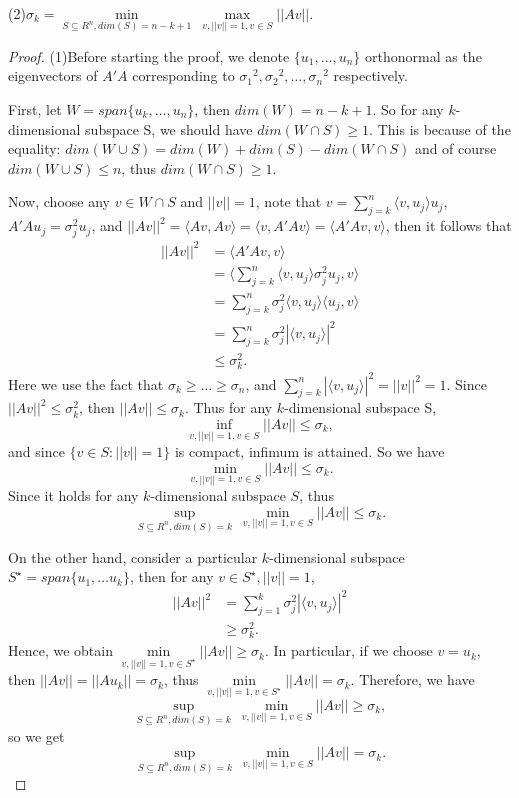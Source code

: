\noindent(2)$\sigma_k=\min \limits_{S\subseteq R^n,dim(S)=n-k+1}\ \max \limits_{v,||v||=1,v\in S} ||Av||.$
\begin{proof}
(1)Before starting the proof, we denote $\{u_1,\dots,u_n\}$ orthonormal as the eigenvectors of $A'A$ corresponding to ${\sigma_1}^2, {\sigma_2}^2, \dots, {\sigma_n}^2$ respectively.

First, let $W=span\{u_k,\dots,u_n\}$, then $dim(W)=n-k+1$. So for any $k$-dimensional subspace S, we should have $dim(W\cap S)\geq 1$. This is because of the equality: $dim(W\cup S)=dim(W)+dim(S)-dim(W\cap S)$ and of course $dim(W\cup S)\leq n$, thus $dim(W\cap S)\geq 1$.

Now, choose any $v\in W\cap S$ and $||v||=1$, note that $v=\sum\limits_{j=k}^n \langle v,u_j\rangle u_j$, $A'Au_j =\sigma_j^2 u_j$, and
$||Av||^2 = \langle Av, Av\rangle  = \langle v, A'Av\rangle  = \langle A'Av, v\rangle $, then it follows that
\begin{equation*}
  \begin{aligned}
  ||Av||^2&= \langle A'Av, v\rangle \\
  &=\langle \sum\limits_{j=k}^n \langle v,u_j\rangle \sigma_j^2 u_j, v\rangle \\
  &=\sum\limits_{j=k}^n \sigma_j^2\langle v,u_j\rangle \langle u_j, v\rangle \\
  &=\sum\limits_{j=k}^n \sigma_j^2|\langle v,u_j\rangle |^2\\
  &\leq \sigma_k^2.
  \end{aligned}
\end{equation*}
Here we use the fact that $\sigma_k\geq\dots\geq\sigma_n$, and $\sum\limits_{j=k}^n |\langle v,u_j\rangle |^2=||v||^2=1$. Since $||Av||^2\leq\sigma_k^2$, then $||Av||\leq\sigma_k$. Thus for any $k$-dimensional subspace S, $$ \inf \limits_{v,||v||=1,v\in S} ||Av|| \leq \sigma_k,$$
and since $\{v \in S: ||v||=1\}$ is compact, infimum is attained. So we have $$\min \limits_{v,||v||=1,v\in S} ||Av|| \leq \sigma_k.$$
Since it holds for any $k$-dimensional subspace $S$, thus $$\sup \limits_{S\subseteq R^n,dim(S)=k}\ \min \limits_{v,||v||=1,v\in S} ||Av||\leq\sigma_k.$$

On the other hand, consider a particular $k$-dimensional subspace $S^\star=span\{u_1, \dots u_k\}$, then for any $v \in S^\star, ||v||=1$,
\begin{equation*}
  \begin{aligned}
  ||Av||^2 &=\sum\limits_{j=1}^k \sigma_j^2|\langle v,u_j\rangle |^2\\
  &\geq \sigma_k^2.
  \end{aligned}
\end{equation*}
Hence, we obtain $\min \limits_{v,||v||=1,v\in S^\star} ||Av||\geq\sigma_k$. In particular, if we choose $v=u_k$, then $||Av||=||Au_k||=\sigma_k$, thus $\min \limits_{v,||v||=1,v\in S^\star} ||Av||=\sigma_k$. Therefore, we have $$\sup \limits_{S\subseteq R^n,dim(S)=k}\ \min \limits_{v,||v||=1,v\in S} ||Av||\geq\sigma_k,$$
so we get $$\sup \limits_{S\subseteq R^n,dim(S)=k}\ \min \limits_{v,||v||=1,v\in S} ||Av||=\sigma_k.$$


\end{proof}
